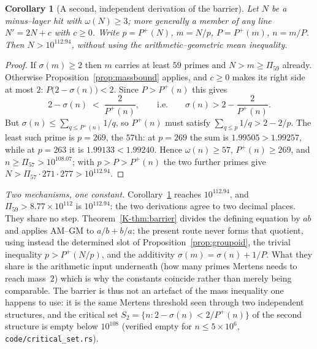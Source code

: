\documentclass[11pt]{article}
\newtheorem{corollary}[theorem]{Corollary}
\theoremstyle{definition}
\begin{document}
\begin{corollary}[A second, independent derivation of the barrier]\label{cor:secondbarrier}
Let $N$ be a minus--layer hit with $\omega(N)\ge3$; more generally a member of any line
$N'=2N+c$ with $c\ge0$. Write $p=P^+(N)$, $m=N/p$, $P=P^+(m)$, $n=m/P$. Then
$N>10^{112.94}$, without using the arithmetic--geometric mean inequality.
\end{corollary}
\begin{proof}
If $\sigma(m)\ge2$ then $m$ carries at least $59$ primes and $N>m\ge\Pi_{59}$ already. Otherwise
Proposition~\ref{prop:massbound} applies, and $c\ge0$ makes its right side at most $2$:
$P\bigl(2-\sigma(n)\bigr)<2$. Since $P>P^+(n)$ this gives
\[ 2-\sigma(n)\;<\;\frac2{P^+(n)},\qquad\text{i.e.}\qquad \sigma(n)>2-\frac2{P^+(n)}. \]
But $\sigma(n)\le\sum_{q\le P^+(n)}1/q$, so $P^+(n)$ must satisfy
$\sum_{q\le p}1/q>2-2/p$. The least such prime is $p=269$, the $57$th: at $p=269$ the sum is
$1.99505>1.99257$, while at $p=263$ it is $1.99133<1.99240$. Hence $\omega(n)\ge57$,
$P^+(n)\ge269$, and $n\ge\Pi_{57}>10^{108.07}$; with $p>P>P^+(n)$ the two further primes give
$N>\Pi_{57}\cdot271\cdot277>10^{112.94}$.
\end{proof}

\emph{Two mechanisms, one constant.} Corollary~\ref{cor:secondbarrier} reaches $10^{112.94}$, and $\Pi_{59}>8.77\times10^{112}$ is
$10^{112.94}$: the two derivations agree to two decimal places. They share no step.
Theorem~\ref{K-thm:barrier} divides the defining equation by $ab$ and applies AM--GM to
$a/b+b/a$; the present route never forms that quotient, using instead the determined slot of
Proposition~\ref{prop:groupoid}, the trivial inequality $p>P^+(N/p)$, and the additivity
$\sigma(m)=\sigma(n)+1/P$. What they share is the arithmetic input underneath (how many primes
Mertens needs to reach mass~$2$) which is why the constants coincide rather than merely being
comparable. The barrier is thus not an artefact of the mass inequality one happens to use: it is
the same Mertens threshold seen through two independent structures, and the critical set
$S_2=\{n:2-\sigma(n)<2/P^+(n)\}$ of the second structure is empty below $10^{108}$ (verified empty
for $n\le5\times10^6$, \texttt{code/critical\_set.rs}).
\end{document}
